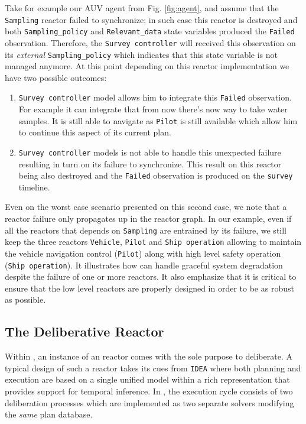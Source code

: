 Take for example our AUV agent from Fig. \ref{fig:agent},
and assume that the \texttt{Sampling} reactor failed to synchronize;
in  such case this reactor is destroyed and both
\texttt{Sampling\_policy} and \texttt{Relevant\_data} state variables
produced the \texttt{Failed} observation. Therefore, the
\texttt{Survey controller} will received this observation on its {\em
  external} \texttt{Sampling\_policy} which indicates that this state
variable is not managed anymore. At this point depending on this
reactor implementation we have two possible outcomes:
\begin{enumerate}
\item \texttt{Survey  controller} model allows him to integrate this
  \texttt{Failed} observation. For example it can integrate that from
  now there's now way to take water samples. It is still able to
  navigate as \texttt{Pilot} is still available which allow him to
  continue this aspect of its current plan.
\item \texttt{Survey controller} models is not able to handle this
  unexpected failure resulting in turn on its failure to
  synchronize. This result on this reactor being also destroyed and
  the \texttt{Failed} observation is produced on the \texttt{survey}
  timeline.
\end{enumerate}
Even on the worst case scenario presented on this second case, we
note that a reactor failure only propagates up in the reactor graph. 
In our example, even if all the reactors that depends on
\texttt{Sampling} are entrained by its failure, we still keep the
three reactors \texttt{Vehicle}, \texttt{Pilot} and \texttt{Ship
  operation} allowing to  maintain the vehicle navigation control
(\texttt{Pilot}) along with high level safety operation 
(\texttt{Ship operation}). It illustrates how \rx can handle graceful
system degradation despite the failure of one or more reactors. It
also emphasize that it is critical to ensure that the low level
reactors are properly designed in order to be as robust as 
possible. 

\subsection{The  Deliberative Reactor}
\label{sec:arch:europa}

Within \rxe, an instance of an \eu reactor comes with the sole purpose
to deliberate. A typical design of such a reactor takes its cues from
\texttt{IDEA} \cite{mus02, mus06} where both planning and execution
are based on a single unified model within a rich representation that
provides support for temporal inference. In \rxe, the execution cycle
consists of two deliberation processes which are implemented as two
separate \eu solvers modifying the \emph{same} plan database.

